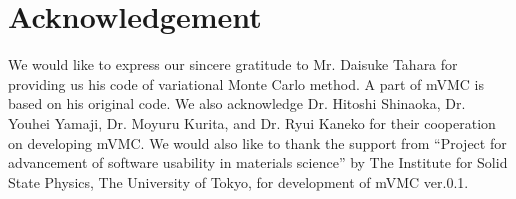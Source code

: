\chapter{Acknowledgement}
\label{Ch:ack}
We would like to express our sincere gratitude to Mr. Daisuke Tahara
for providing us his code of variational Monte Carlo method.
A part of mVMC is based on his original code.
We also acknowledge Dr. Hitoshi Shinaoka, Dr. Youhei Yamaji, 
Dr. Moyuru Kurita, and Dr. Ryui Kaneko for their cooperation on developing mVMC.
We would also like to thank the support from “Project for advancement of software 
usability in materials science” by The Institute for Solid State Physics, 
The University of Tokyo, for development of mVMC ver.0.1. 
